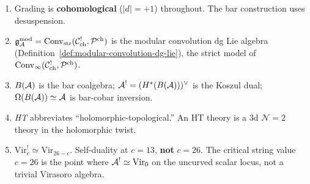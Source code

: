 \begin{enumerate}[label=\textup{(\alph*)}]
\item Grading is \textbf{cohomological} ($|d| = +1$) throughout.
 The bar construction uses desuspension.

\item $\mathfrak{g}_{\mathcal{A}}^{\mathrm{mod}} = \operatorname{Conv}_{\mathrm{str}}(\mathcal{C}^!_{\mathrm{ch}},
 \mathcal{P}^{\mathrm{ch}})$ is the modular convolution dg Lie
 algebra (Definition~\ref{def:modular-convolution-dg-lie}), the
 strict model of $\operatorname{Conv}_{\infty}(\mathcal{C}^!_{\mathrm{ch}},
 \mathcal{P}^{\mathrm{ch}})$.

\item $B(\mathcal{A})$ is the bar coalgebra; $\mathcal{A}^! = (H^*(B(\mathcal{A})))^\vee$
 is the Koszul dual; $\Omega(B(\mathcal{A})) \simeq \mathcal{A}$ is bar-cobar inversion.

\item \emph{HT} abbreviates ``holomorphic-topological.''
 An HT theory is a 3d $\mathcal{N} = 2$ theory in the holomorphic twist.

\item $\mathrm{Vir}_c^! \simeq \mathrm{Vir}_{26-c}$. Self-duality at
 $c = 13$, \textbf{not} $c = 26$. The critical string value $c = 26$ is
 the point where $\mathcal{A}^! \simeq \mathrm{Vir}_0$ on the uncurved scalar
 locus, not a trivial Virasoro algebra.
\end{enumerate}













